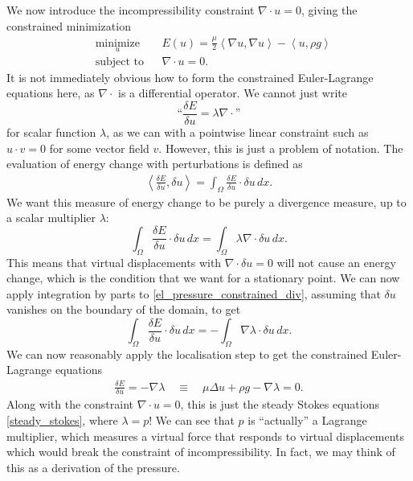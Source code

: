 \documentclass[11pt,a4paper]{memoir}
\newcommand{\inner}[1]{\left<#1\right>}
\newcommand{\om}{{\Omega}}
\begin{document}
We now introduce the incompressibility constraint $\nabla \cdot u = 0$, giving the constrained minimization
\begin{equation}\label{stokes_flow_optimization}
\begin{aligned}
& \underset{u}{\text{minimize}}
& & E(u) =  \frac{\mu}{2} \inner{\nabla u, \nabla u} - \inner{u, \rho g}\\
& \text{subject to}
& & \nabla\cdot u = 0.
\end{aligned}
\end{equation}
It is not immediately obvious how to form the constrained Euler-Lagrange equations here, as $\nabla\cdot$ is a differential operator.
We cannot just write
    $$\text{``}\frac{\delta E}{\delta u} = \lambda\nabla\cdot\text{''}$$
for scalar function $\lambda$, as we can with a pointwise linear constraint such as $u\cdot v = 0$ for some vector field $v$. However, this is just a problem of
notation. The evaluation of energy change with perturbations is defined as
\begin{align*}
    \inner{\frac{\delta E}{\delta u}, \delta u} = \int_\Omega \frac{\delta E}{\delta u}\cdot\delta u\,dx.
\end{align*}
We want this measure of energy change to be purely a divergence measure, up to a scalar multiplier $\lambda$:
\begin{equation}\label{el_pressure_constrained_div}
    \int_\Omega \frac{\delta E}{\delta u}\cdot\delta u\,dx = \int_\om \lambda \nabla\cdot \delta u\,dx.
\end{equation}
This means
that virtual displacements with $\nabla\cdot\delta u = 0$ will not cause an energy change, which is the condition that
we want for a stationary point.
We can now apply integration by parts to \eqref{el_pressure_constrained_div}, assuming that $\delta u$ vanishes on the boundary of the domain, to get
\begin{equation}
    \int_\Omega \frac{\delta E}{\delta u}\cdot\delta u\,dx = -\int_\om \nabla\lambda \cdot \delta u\,dx.
\end{equation}
We can now reasonably apply the localisation step to get the constrained Euler-Lagrange equations
\begin{equation}
\begin{split}
           \frac{\delta E}{\delta u} = -\nabla \lambda
    \quad\equiv\quad \mu\Delta u + \rho g - \nabla \lambda = 0.
\end{split}
\end{equation}
Along with the constraint $\nabla\cdot u = 0$, this is just the steady Stokes equations \eqref{steady_stokes}, where $\lambda = p$! We can see that $p$ is ``actually''
a Lagrange multiplier, which measures a virtual force that responds to virtual displacements which would break the constraint of incompressibility.
In fact, we may think of this as a derivation of the pressure.
\end{document}
